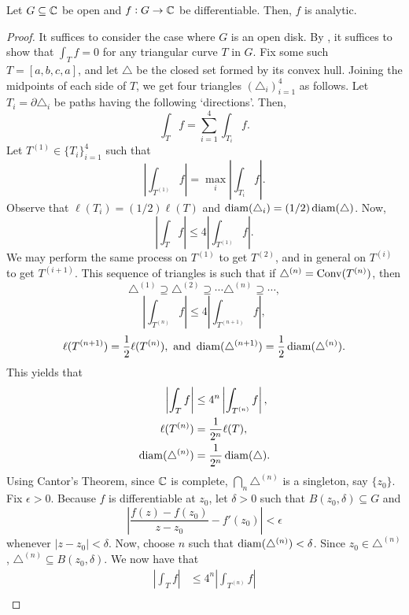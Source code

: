		\begin{ftheo}
			\label{goursats theorem}
			Let $G\subseteq \mathbb{C}$ be open and $f:G\to\mathbb{C}$ be differentiable. Then, $f$ is analytic.
		\end{ftheo}
		\begin{proof}
			It suffices to consider the case where $G$ is an open disk. By , it suffices to show that $\int_T f = 0$ for any triangular curve $T$ in $G$. Fix some such $T = [a,b,c,a]$, and let $\triangle$ be the closed set formed by its convex hull. Joining the midpoints of each side of $T$, we get four triangles $(\triangle_i)_{i=1}^4$ as follows. Let $T_i = \partial \triangle_i$ be paths having the following `directions'. Then,
			\[ \int_T f = \sum_{i=1}^4 \int_{T_i} f. \]
			Let $T^{(1)} \in \{T_i\}_{i=1}^4$ such that
			\[ \left| \int_{T^{(1)}} f \right| = \max_i \left| \int_{T_i} f \right|. \]
			Observe that $\ell(T_i) = (1/2) \ell(T)$ and $\operatorname{diam}(\triangle_i) = (1/2) \operatorname{diam}(\triangle)$. Now,
			\[ \left| \int_T f \right| \le 4 \left| \int_{T^{(1)}} f \right|. \]
			We may perform the same process on $T^{(1)}$ to get $T^{(2)}$, and in general on $T^{(i)}$ to get $T^{(i+1)}$. This sequence of triangles is such that if $\triangle^{(n)} = \operatorname{Conv}(T^{(n)})$, then
			\[ \triangle^{(1)} \supseteq \triangle^{(2)} \supseteq \cdots \triangle^{(n)} \supseteq \cdots, \]
			\[ \left| \int_{T^{(n)}} f \right| \le 4 \left| \int_{T^{(n+1)}} f \right|, \]
			\[ \ell(T^{(n+1)}) = \frac{1}{2} \ell(T^{(n)}), \text{ and } \operatorname{diam}(\triangle^{(n+1)}) = \frac{1}{2} \operatorname{diam}(\triangle^{(n)}). \]
			This yields that
			\begin{align*}
				\left| \int_T f \right| &\le 4^n \left| \int_{T^{(n)}} f \right|, \\
				\ell(T^{(n)}) &= \frac{1}{2^n} \ell(T), \\
				\operatorname{diam}(\triangle^{(n)}) &= \frac{1}{2^n} \operatorname{diam}(\triangle).
			\end{align*}
			Using Cantor's Theorem, since $\mathbb{C}$ is complete, $\bigcap_n \triangle^{(n)}$ is a singleton, say $\{z_0\}$. Fix $\epsilon > 0$. Because $f$ is differentiable at $z_0$, let $\delta > 0$ such that $B(z_0,\delta) \subseteq G$ and
			\[ \left| \frac{f(z) - f(z_0)}{z-z_0} - f'(z_0) \right| < \epsilon \]
			whenever $|z-z_0| < \delta$. Now, choose $n$ such that $\operatorname{diam}(\triangle^{(n)}) < \delta$. Since $z_0 \in \triangle^{(n)}$, $\triangle^{(n)} \subseteq B(z_0,\delta)$. We now have that
			\begin{align*}
				\left| \int_T f \right| &\le 4^n \left| \int_{T^{(n)}} f \right| \\

\end{align*}
\end{proof}
